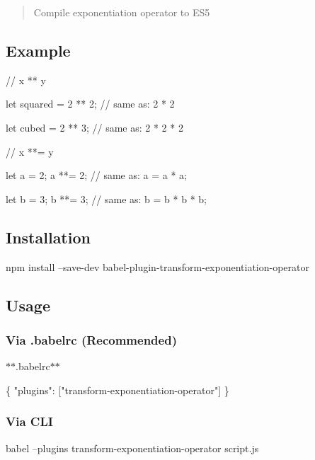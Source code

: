 \begin{quote}
Compile exponentiation operator to E\+S5 \end{quote}


\subsection*{Example}


\begin{DoxyCode}
// x ** y

let squared = 2 ** 2;
// same as: 2 * 2

let cubed = 2 ** 3;
// same as: 2 * 2 * 2


// x **= y

let a = 2;
a **= 2;
// same as: a = a * a;

let b = 3;
b **= 3;
// same as: b = b * b * b;
\end{DoxyCode}


\subsection*{Installation}


\begin{DoxyCode}
npm install --save-dev babel-plugin-transform-exponentiation-operator
\end{DoxyCode}


\subsection*{Usage}

\subsubsection*{Via {\ttfamily .babelrc} (Recommended)}

$\ast$$\ast$.babelrc$\ast$$\ast$


\begin{DoxyCode}
\{
  "plugins": ["transform-exponentiation-operator"]
\}
\end{DoxyCode}


\subsubsection*{Via C\+LI}


\begin{DoxyCode}
babel --plugins transform-exponentiation-operator script.js
\end{DoxyCode}


